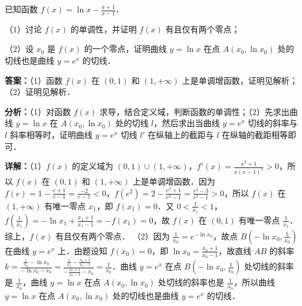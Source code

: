 \begin{question}[points=12]
已知函数 $f(x)=\ln x-\frac{x+1}{x-1}$．

（1）讨论 $f(x)$ 的单调性，并证明 $f(x)$ 有且仅有两个零点；

（2）设 $x_0$ 是 $f(x)$ 的一个零点，证明曲线 $y=\ln x$ 在点 $A(x_0,\ln x_0)$ 处的切线也是曲线 $y=e^x$ 的切线．
\begin{solution}
\textbf{答案：}（1）函数 $f(x)$ 在 $(0,1)$ 和 $(1,+\infty)$ 上是单调增函数，证明见解析；（2）证明见解析．

\textbf{分析：}（1）对函数 $f(x)$ 求导，结合定义域，判断函数的单调性；（2）先求出曲线 $y=\ln x$ 在 $A(x_0,\ln x_0)$ 处的切线 $l$，然后求出当曲线 $y=e^x$ 切线的斜率与 $l$ 斜率相等时，证明曲线 $y=e^x$ 切线 $l'$ 在纵轴上的截距与 $l$ 在纵轴的截距相等即可．

\textbf{详解：}（1）$f(x)$ 的定义域为 $(0,1)\cup(1,+\infty)$，$f'(x)=\frac{x^2+1}{x(x-1)^2}>0$，所以 $f(x)$ 在 $(0,1)$ 和 $(1,+\infty)$ 上是单调增函数．因为 $f(e)=1-\frac{e+1}{e-1}=\frac{-2}{e-1}<0$，$f(e^2)=2-\frac{e^2+1}{e^2-1}=\frac{e^2-3}{e^2-1}>0$，所以 $f(x)$ 在 $(1,+\infty)$ 有唯一零点 $x_1$，即 $f(x_1)=0$．又 $0<\frac{1}{x_1}<1$，$f(\frac{1}{x_1})=-\ln x_1+\frac{x_1+1}{x_1-1}=-f(x_1)=0$，故 $f(x)$ 在 $(0,1)$ 有唯一零点 $\frac{1}{x_1}$．综上，$f(x)$ 有且仅有两个零点．
（2）因为 $\frac{1}{x_0}=e^{-\ln x_0}$，故点 $B(-\ln x_0,\frac{1}{x_0})$ 在曲线 $y=e^x$ 上．由题设知 $f(x_0)=0$，即 $\ln x_0=\frac{x_0+1}{x_0-1}$，故直线 $AB$ 的斜率 $k=\frac{\frac{1}{x_0}-\ln x_0}{-\ln x_0-x_0}=\frac{\frac{1}{x_0}-\frac{x_0+1}{x_0-1}}{-\frac{x_0+1}{x_0-1}-x_0}=\frac{1}{x_0}$．曲线 $y=e^x$ 在点 $B(-\ln x_0,\frac{1}{x_0})$ 处切线的斜率是 $\frac{1}{x_0}$，曲线 $y=\ln x$ 在点 $A(x_0,\ln x_0)$ 处切线的斜率也是 $\frac{1}{x_0}$，所以曲线 $y=\ln x$ 在点 $A(x_0,\ln x_0)$ 处的切线也是曲线 $y=e^x$ 的切线．
\end{solution}
\end{question}


